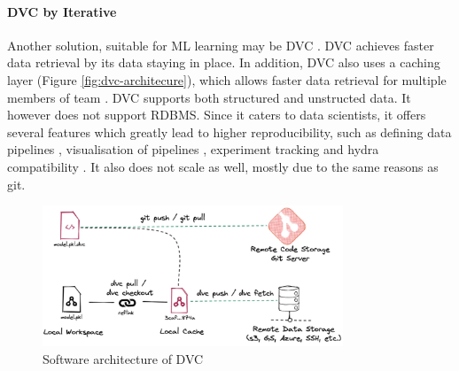 \paragraph{DVC by Iterative}
Another solution, suitable for ML learning may be DVC \cite{DVC}. DVC achieves
faster data retrieval by its data staying in place. In addition, DVC also uses a
caching layer (Figure \ref{fig:dvc-architecure}), which allows faster data
retrieval for multiple members of team \cite{comparison}. DVC supports both
structured and unstructed data. It however does not support RDBMS. Since it
caters to data scientists, it offers several features which greatly lead to
higher reproducibility, such as defining data pipelines
\cite{dvc-define-pipelines}, visualisation of pipelines
\cite{dvc-run-pipelines}, experiment tracking \cite{dvc-compare-experiments} and
hydra compatibility \cite{dvc-hydra}. It also does not scale as well, mostly due
to the same reasons as git.

\begin{figure}[H]
    \centering
    \includegraphics[width=0.8\textwidth]{fig/dvc-arch.png}
    \caption{Software architecture of DVC \cite{comparison}}
    \label{fig:dvc-architecture}
\end{figure}

